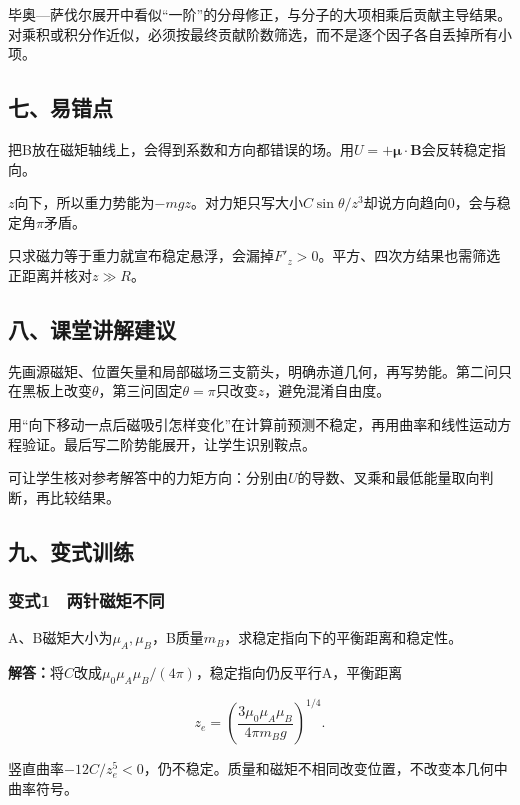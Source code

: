 \documentclass[12pt,a4paper,fontset=fandol]{ctexart}
\begin{document}
毕奥---萨伐尔展开中看似``一阶''的分母修正，与分子的大项相乘后贡献主导结果。对乘积或积分作近似，必须按最终贡献阶数筛选，而不是逐个因子各自丢掉所有小项。

\subsection{七、易错点}\label{ux4e03ux6613ux9519ux70b9-3}

把B放在磁矩轴线上，会得到系数和方向都错误的场。用\(U=+\boldsymbol\mu\cdot\boldsymbol B\)会反转稳定指向。

\(z\)向下，所以重力势能为\(-mgz\)。对力矩只写大小\(C\sin\theta/z^3\)却说方向趋向0，会与稳定角\(\pi\)矛盾。

只求磁力等于重力就宣布稳定悬浮，会漏掉\(F'_z>0\)。平方、四次方结果也需筛选正距离并核对\(z\gg R\)。

\subsection{八、课堂讲解建议}\label{ux516bux8bfeux5802ux8bb2ux89e3ux5efaux8bae-3}

先画源磁矩、位置矢量和局部磁场三支箭头，明确赤道几何，再写势能。第二问只在黑板上改变\(\theta\)，第三问固定\(\theta=\pi\)只改变\(z\)，避免混淆自由度。

用``向下移动一点后磁吸引怎样变化''在计算前预测不稳定，再用曲率和线性运动方程验证。最后写二阶势能展开，让学生识别鞍点。

可让学生核对参考解答中的力矩方向：分别由\(U\)的导数、叉乘和最低能量取向判断，再比较结果。

\subsection{九、变式训练}\label{ux4e5dux53d8ux5f0fux8badux7ec3-3}

\subsubsection{变式1　两针磁矩不同}\label{ux53d8ux5f0f1-ux4e24ux9488ux78c1ux77e9ux4e0dux540c}

A、B磁矩大小为\(\mu_A,\mu_B\)，B质量\(m_B\)，求稳定指向下的平衡距离和稳定性。

\textbf{解答：}将\(C\)改成\(\mu_0\mu_A\mu_B/(4\pi)\)，稳定指向仍反平行A，平衡距离

\[
z_e=\left(\frac{3\mu_0\mu_A\mu_B}{4\pi m_Bg}\right)^{1/4}.
\]

竖直曲率\(-12C/z_e^5<0\)，仍不稳定。质量和磁矩不相同改变位置，不改变本几何中曲率符号。
\end{document}
